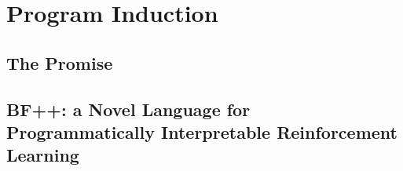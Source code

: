\usepackage{lipsum}




\coverpage{\TITLE}{\SUBTITLE}{\AUTHOR}{\DATE}{\SUBJECT}

\newpage



\tableofcontents

\listoffigures

\listoftables


\printnomenclature

\part{Program Induction}
\newpage
\chapter{The Promise} \label{ch:autocode-motiv}

%

\newpage
\chapter{BF++: a Novel Language for Programmatically Interpretable Reinforcement Learning}\label{ch:autocode-dsl}


